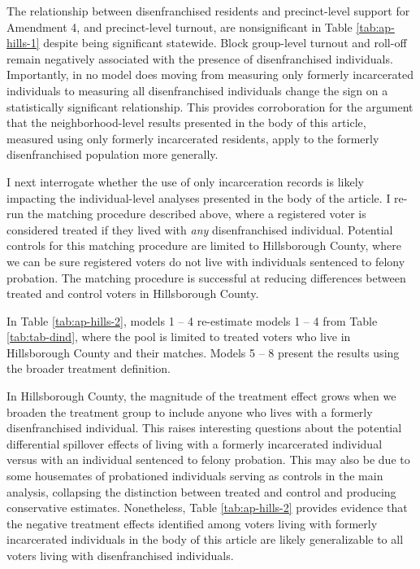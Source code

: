 \documentclass[
  12pt,
]{article}
\begin{document}
\begin{singlespace}


\end{singlespace}

The relationship between disenfranchised residents and precinct-level support for Amendment 4, and precinct-level turnout, are nonsignificant in Table \ref{tab:ap-hills-1} despite being significant statewide. Block group-level turnout and roll-off remain negatively associated with the presence of disenfranchised individuals. Importantly, in no model does moving from measuring only formerly incarcerated individuals to measuring all disenfranchised individuals change the sign on a statistically significant relationship. This provides corroboration for the argument that the neighborhood-level results presented in the body of this article, measured using only formerly incarcerated residents, apply to the formerly disenfranchised population more generally.

I next interrogate whether the use of only incarceration records is likely impacting the individual-level analyses presented in the body of the article. I re-run the matching procedure described above, where a registered voter is considered treated if they lived with \emph{any} disenfranchised individual. Potential controls for this matching procedure are limited to Hillsborough County, where we can be sure registered voters do not live with individuals sentenced to felony probation. The matching procedure is successful at reducing differences between treated and control voters in Hillsborough County.

In Table \ref{tab:ap-hills-2}, models 1 -- 4 re-estimate models 1 -- 4 from Table \ref{tab:tab-dind}, where the pool is limited to treated voters who live in Hillsborough County and their matches. Models 5 -- 8 present the results using the broader treatment definition.

\begin{singlespace}

\end{singlespace}

In Hillsborough County, the magnitude of the treatment effect grows when we broaden the treatment group to include anyone who lives with a formerly disenfranchised individual. This raises interesting questions about the potential differential spillover effects of living with a formerly incarcerated individual versus with an individual sentenced to felony probation. This may also be due to some housemates of probationed individuals serving as controls in the main analysis, collapsing the distinction between treated and control and producing conservative estimates. Nonetheless, Table \ref{tab:ap-hills-2} provides evidence that the negative treatment effects identified among voters living with formerly incarcerated individuals in the body of this article are likely generalizable to all voters living with disenfranchised individuals.
\end{document}
